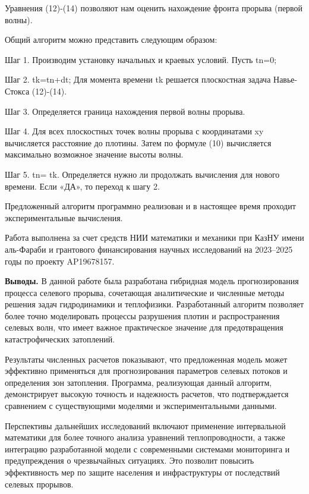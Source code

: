 \begin{multicols}{2}
Уравнения (12)-(14) позволяют нам оценить нахождение фронта прорыва
(первой волны).

Общий алгоритм можно представить следующим образом:

Шаг 1. Производим установку начальных и краевых условий. Пусть tn=0;

Шаг 2. tk=tn+dt; Для момента времени tk решается плоскостная задача
Навье-Стокса (12)-(14).

Шаг 3. Определяется граница нахождения первой волны прорыва.

Шаг 4. Для всех плоскостных точек волны прорыва с координатами xy
вычисляется расстояние до плотины. Затем по формуле (10) вычисляется
максимально возможное значение высоты волны.

Шаг 5. tn= tk. Определяется нужно ли продолжать вычисления для нового
времени. Если «ДА», то переход к шагу 2.

Предложенный алгоритм программно реализован и в настоящее время проходит
экспериментальные вычисления.

Работа выполнена за счет средств НИИ математики и механики при КазНУ
имени аль-Фараби и грантового финансирования научных исследований на
2023--2025 годы по проекту AP19678157.

{\bfseries Выводы.} В данной работе была разработана гибридная модель
прогнозирования процесса селевого прорыва, сочетающая аналитические и
численные методы решения задач гидродинамики и теплофизики.
Разработанный алгоритм позволяет более точно моделировать процессы
разрушения плотин и распространения селевых волн, что имеет важное
практическое значение для предотвращения катастрофических затоплений.

Результаты численных расчетов показывают, что предложенная модель может
эффективно применяться для прогнозирования параметров селевых потоков и
определения зон затопления. Программа, реализующая данный алгоритм,
демонстрирует высокую точность и надежность расчетов, что подтверждается
сравнением с существующими моделями и экспериментальными данными.

Перспективы дальнейших исследований включают применение интервальной
математики для более точного анализа уравнений теплопроводности, а также
интеграцию разработанной модели с современными системами мониторинга и
предупреждения о чрезвычайных ситуациях. Это позволит повысить
эффективность мер по защите населения и инфраструктуры от последствий
селевых прорывов.
\end{multicols}

